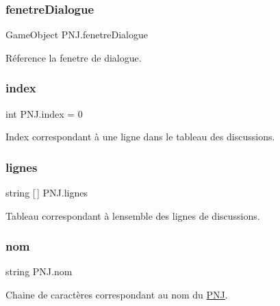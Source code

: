 \subsubsection{\texorpdfstring{fenetre\+Dialogue}{fenetreDialogue}}
{\footnotesize\ttfamily Game\+Object P\+N\+J.\+fenetre\+Dialogue\hspace{0.3cm}{\ttfamily [private]}}

Réference la fenetre de dialogue. \mbox{\label{class_p_n_j_a812687a1e8b5e0c95deb1a7c5ffd30dd}} 
\subsubsection{\texorpdfstring{index}{index}}
{\footnotesize\ttfamily int P\+N\+J.\+index = 0\hspace{0.3cm}{\ttfamily [private]}}

Index correspondant à une ligne dans le tableau des discussions. \mbox{\label{class_p_n_j_aeffd150ca229e21cecbacba72f056c98}} 
\subsubsection{\texorpdfstring{lignes}{lignes}}
{\footnotesize\ttfamily string \mbox{[}$\,$\mbox{]} P\+N\+J.\+lignes\hspace{0.3cm}{\ttfamily [private]}}

Tableau correspondant à l\textquotesingle{}ensemble des lignes de discussions. \mbox{\label{class_p_n_j_a93fb35f7f29355e2c23b951d7b2e0dc0}} 
\subsubsection{\texorpdfstring{nom}{nom}}
{\footnotesize\ttfamily string P\+N\+J.\+nom\hspace{0.3cm}{\ttfamily [private]}}

Chaine de caractères correspondant au nom du \mbox{\hyperlink{class_p_n_j}{P\+NJ}}. \mbox{\label{class_p_n_j_adb71316fd171c95bb50a17cc66057ea6}} 

